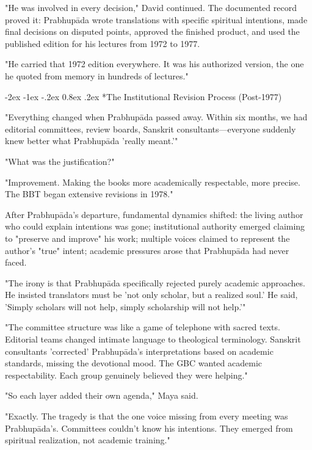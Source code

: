 \documentclass[12pt,twoside]{book}
\makeatletter
\let\oldsubsection\subsection
\renewcommand{\subsection}[1]{\needspace{3\baselineskip}\oldsubsection{#1}}
\renewcommand\subsection{\@startsection{subsection}{2}{\z@}%
{-2ex \@plus -1ex \@minus -.2ex}%
{0.8ex \@plus .2ex}%
{\normalfont\large\bfseries}}
\makeatother
\begin{document}
"He was involved in every decision," David continued. The documented record proved it: Prabhupāda wrote translations with specific spiritual intentions, made final decisions on disputed points, approved the finished product, and used the published edition for his lectures from 1972 to 1977.

"He carried that 1972 edition everywhere. It was his authorized version, the one he quoted from memory in hundreds of lectures."


\vspace{0.1cm}
\subsection*{The Institutional Revision Process (Post-1977)}

"Everything changed when Prabhupāda passed away. Within six months, we had editorial committees, review boards, Sanskrit consultants—everyone suddenly knew better what Prabhupāda 'really meant.'"

"What was the justification?"

"Improvement. Making the books more academically respectable, more precise. The BBT began extensive revisions in 1978."

After Prabhupāda's departure, fundamental dynamics shifted: the living author who could explain intentions was gone; institutional authority emerged claiming to "preserve and improve" his work; multiple voices claimed to represent the author's "true" intent; academic pressures arose that Prabhupāda had never faced.

"The irony is that Prabhupāda specifically rejected purely academic approaches. He insisted translators must be 'not only scholar, but a realized soul.' He said, 'Simply scholars will not help, simply scholarship will not help.'"

"The committee structure was like a game of telephone with sacred texts. Editorial teams changed intimate language to theological terminology. Sanskrit consultants 'corrected' Prabhupāda's interpretations based on academic standards, missing the devotional mood. The GBC wanted academic respectability. Each group genuinely believed they were helping."

"So each layer added their own agenda," Maya said.

"Exactly. The tragedy is that the one voice missing from every meeting was Prabhupāda's. Committees couldn't know his intentions. They emerged from spiritual realization, not academic training."
\end{document}
